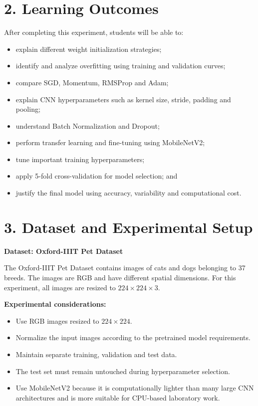 \documentclass[10pt]{article}
\begin{document}
\section*{2. Learning Outcomes}
After completing this experiment, students will be able to:
\begin{itemize}
\item explain different weight initialization strategies;
\item identify and analyze overfitting using training and validation curves;
\item compare SGD, Momentum, RMSProp and Adam;
\item explain CNN hyperparameters such as kernel size, stride, padding and pooling;
\item understand Batch Normalization and Dropout;
\item perform transfer learning and fine-tuning using MobileNetV2;
\item tune important training hyperparameters;
\item apply 5-fold cross-validation for model selection; and
\item justify the final model using accuracy, variability and computational cost.
\end{itemize}

\section*{3. Dataset and Experimental Setup}
\textbf{Dataset: Oxford-IIIT Pet Dataset}

The Oxford-IIIT Pet Dataset contains images of cats and dogs belonging
to 37 breeds. The images are RGB and have different spatial dimensions.
For this experiment, all images are resized to $224\times224\times3$.

\textbf{Experimental considerations:}
\begin{itemize}
\item Use RGB images resized to $224\times224$.
\item Normalize the input images according to the pretrained model requirements.
\item Maintain separate training, validation and test data.
\item The test set must remain untouched during hyperparameter selection.
\item Use MobileNetV2 because it is computationally lighter than many
large CNN architectures and is more suitable for CPU-based laboratory work.
\end{itemize}
\end{document}
